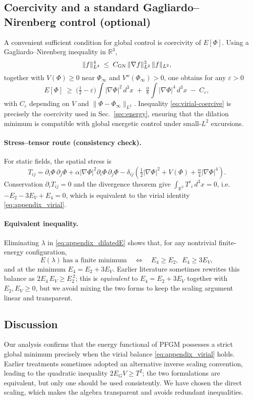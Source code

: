 \documentclass{article}
\begin{document}
\subsection{Coercivity and a standard Gagliardo–Nirenberg control (optional)}
\label{app:virial-coercivity}
A convenient sufficient condition for global control is coercivity of $E[\Phi]$. Using a Gagliardo–Nirenberg inequality in $\mathbb{R}^3$,
\[
\|f\|_{L^4}^4 \;\le\; C_{\rm GN}\,\|\nabla f\|_{L^2}^3\,\|f\|_{L^2},
\]
together with $V(\Phi)\ge 0$ near $\Phi_\infty$ and $V''(\Phi_\infty)>0$, one obtains for any $\varepsilon>0$
\begin{equation}
E[\Phi] \;\ge\; \Big(\tfrac12-\varepsilon\Big)\!\int |\nabla\Phi|^2\,d^3x \;+\; \tfrac{\alpha}{8}\!\int |\nabla\Phi|^4\,d^3x \;-\; C_\varepsilon,
\label{eq:virial-coercive}
\end{equation}
with $C_\varepsilon$ depending on $V$ and $\|\Phi-\Phi_\infty\|_{L^2}$. Inequality \eqref{eq:virial-coercive} is precisely the coercivity used in Sec.~\ref{sec:energy}, ensuring that the dilation minimum is compatible with global energetic control under small-$L^2$ excursions.
\paragraph{Stress–tensor route (consistency check).}
For static fields, the spatial stress is
\[
T_{ij}=\partial_i\Phi\,\partial_j\Phi + \alpha|\nabla\Phi|^2\partial_i\Phi\,\partial_j\Phi
-\delta_{ij}\!\left(\tfrac12|\nabla\Phi|^2 + V(\Phi) + \tfrac{\alpha}{4}|\nabla\Phi|^4\right).
\]
Conservation $\partial_i T_{ij}=0$ and the divergence theorem give
$\int_{\mathbb{R}^3}T^i{}_i\,d^3x=0$, i.e.
$-E_2 - 3E_V + E_4=0$, which is equivalent to the virial identity \eqref{eq:appendix_virial}.
\paragraph{Equivalent inequality.}
Eliminating $\lambda$ in \eqref{eq:appendix_dilatedE} shows that, for any nontrivial finite-energy configuration,
\[
E(\lambda)\ \text{has a finite minimum} \quad\Longleftrightarrow\quad E_4 \ge E_2,\ \ E_4 \ge 3E_V,
\]
and at the minimum $E_4=E_2+3E_V$. Earlier literature sometimes rewrites this balance as
$2E_4\,E_V \ge E_2^{\ 2}$; this is \emph{equivalent} to $E_4=E_2+3E_V$ together with $E_2,E_V\ge0$, but we avoid mixing the two forms to keep the scaling argument linear and transparent.


\subsection{Discussion}
Our analysis confirms that the energy functional of PFGM possesses a strict global minimum precisely when the virial balance \eqref{eq:appendix_virial} holds. 
Earlier treatments sometimes adopted an alternative inverse scaling convention, leading to the quadratic inequality $2E_G V \ge T^2$; the two formulations are equivalent, but only one should be used consistently. 
We have chosen the direct scaling, which makes the algebra transparent and avoids redundant inequalities.
\end{document}
